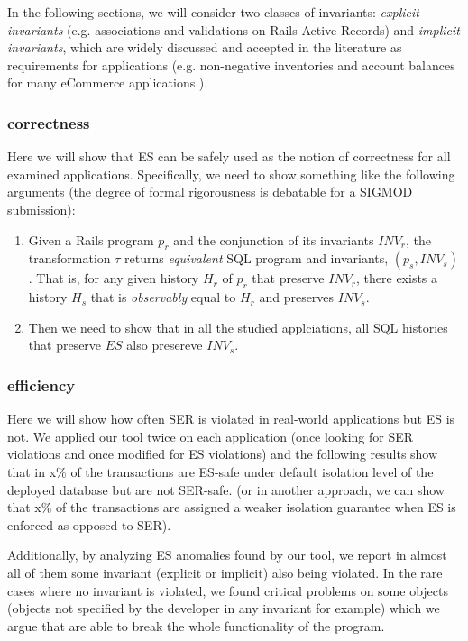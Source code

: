 \documentclass[12pt,letter]{article}
\begin{document}
In the following sections, we will consider two classes of invariants: \emph{explicit
invariants} (e.g. associations and validations on Rails Active Records) and
\emph{implicit invariants}, which are widely discussed and accepted in the
literature as requirements for applications (e.g. non-negative inventories
and account balances for many eCommerce applications \cite{Bailis:Feral}).


\subsubsection{correctness}
Here we will show that ES can be safely used as the notion of
correctness for all examined applications. Specifically, we need to show
something like the following arguments (the degree of formal rigorousness is debatable for a SIGMOD
submission):
\begin{enumerate}
  \item Given a Rails program $p_r$ and the conjunction of its invariants
    $INV_r$, the transformation $\tau$ returns \emph{equivalent} SQL
    program and invariants, $(p_s,INV_s)$. That is, for any given history $H_r$ of $p_r$ that preserve
    $INV_r$, 
    there exists a history $H_s$ that is \emph{observably} equal to $H_r$
    and preserves $INV_s$.

  \item Then we need to show that in all the studied applciations, all SQL histories that preserve $ES$ also presereve $INV_s$.
\end{enumerate}

\subsubsection{efficiency}
Here we will show how often SER is violated in real-world applications but
ES is not. We applied our tool twice on each application (once looking for
SER violations and once modified for ES violations) and the following
results show that in x\% of the transactions are ES-safe under default
isolation level of the deployed database but are not SER-safe.
(or in another approach, we can show that x\% of the transactions are
assigned a weaker isolation guarantee when ES is enforced as opposed to
SER).

Additionally, by analyzing ES anomalies found by our tool, we report in
almost all of them some invariant (explicit or implicit) also being
violated. In the rare cases where no invariant is violated, we found
critical problems on some objects (objects not specified by the developer
in any invariant for example) which we argue that are able to break the
whole functionality of the program.
\end{document}
